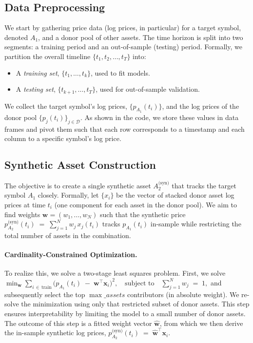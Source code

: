 \subsection{Data Preprocessing}
We start by gathering price data (log prices, in particular) for a target symbol, denoted $A_1$, and a donor pool of other assets. The time horizon is split into two segments: a training period and an out-of-sample (testing) period. Formally, we partition the overall timeline $\{ t_1, t_2, \ldots, t_T \}$ into:

\begin{itemize}
    \item A \textit{training set}, $\{ t_1, \ldots, t_{k} \}$, used to fit models.
    \item A \textit{testing set}, $\{ t_{k+1}, \ldots, t_T \}$, used for out-of-sample validation.
\end{itemize}

We collect the target symbol's log prices, $\{ p_{A_1}(t_i) \}$, and the log prices of the donor pool $\{ p_{j}(t_i) \}_{j \in \mathcal{D}}$. As shown in the code, we store these values in data frames and pivot them such that each row corresponds to a timestamp and each column to a specific symbol's log price.

\subsection{Synthetic Asset Construction}
The objective is to create a single synthetic asset $A_2^\text{(syn)}$ that tracks the target symbol $A_1$ closely. Formally, let $\{ x_i \}$ be the vector of stacked donor asset log prices at time $t_i$ (one component for each asset in the donor pool). We aim to find weights $\mathbf{w} = (w_1, \ldots, w_N)$ such that the synthetic price 
$
   p_{A_2}^\text{(syn)}(t_i) \;=\; \sum_{j=1}^{N} w_j\, x_{j}(t_i)
$
tracks $ p_{A_1}(t_i)$ in-sample while restricting the total number of assets in the combination. 

\paragraph{Cardinality-Constrained Optimization.}
To realize this, we solve a two-stage least squares problem. First, we solve
$
   \min_{\mathbf{w}} \sum_{i\,\in\,\text{train}} \bigl(p_{A_1}(t_i) \;-\; \mathbf{w}^\top \mathbf{x}_i\bigr)^2,
   \quad \text{subject to} \quad \sum_{j=1}^N w_j \;=\; 1,
$
and subsequently select the top $\max\_assets$ contributors (in absolute weight). We re-solve the minimization using only that restricted subset of donor assets. This step ensures interpretability by limiting the model to a small number of donor assets. The outcome of this step is a fitted weight vector $\widehat{\mathbf{w}}$, from which we then derive the in-sample synthetic log prices,
$
    p_{A_2}^\text{(syn)}(t_i) \;=\; \widehat{\mathbf{w}}^\top \mathbf{x}_i.
$

